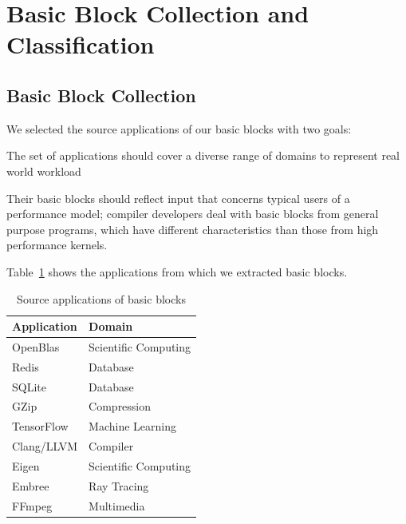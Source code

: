 \section{Basic Block Collection and Classification}
\subsection{Basic Block Collection}
We selected the source applications of our basic blocks with two goals:
\begin{enumerate*}
    \item The set of applications should cover a diverse range
of domains to represent real world workload
    \item Their basic blocks should reflect input that concerns typical users of a performance model;
    compiler developers deal with
    basic blocks from general purpose programs,
    which have different characteristics
    than those from 
    high performance kernels. 
\end{enumerate*}
Table~\ref{tab:apps} shows the applications from which we extracted basic blocks.

\begin{table}
\begin{tabular}{|p{}|p{}|}
\hline
Application & Domain \\

\hline
OpenBlas & Scientific Computing \\

\hline
Redis & Database \\

\hline
SQLite & Database \\

\hline
GZip & Compression \\

\hline
TensorFlow & Machine Learning \\

\hline 
Clang/LLVM & Compiler \\

\hline
Eigen & Scientific Computing \\

\hline
Embree & Ray Tracing\\

\hline
FFmpeg & Multimedia\\
\hline
\end{tabular}
\\
\caption{Source applications of basic blocks}
\label{tab:apps}
\end{table}

